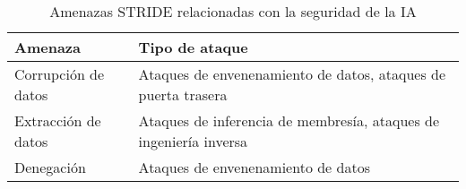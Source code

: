 \begin{landscape}

    \begin{table}[ht!]
        \centering
        \small
        \def\arraystretch{1.5}
        \begin{tabular}{lp{10cm}}
            \toprule
            \textbf{Amenaza}    & \textbf{Tipo de ataque}                                           \\
            \midrule
            Corrupción de datos & Ataques de envenenamiento de datos, ataques de puerta trasera     \\
            Extracción de datos & Ataques de inferencia de membresía, ataques de ingeniería inversa \\
            Denegación          & Ataques de envenenamiento de datos                                \\
            \bottomrule
        \end{tabular}
        \caption{Amenazas STRIDE relacionadas con la seguridad de la IA}
        \label{Tabla.Requisitos}
    \end{table}

\end{landscape}
\restoregeometry
